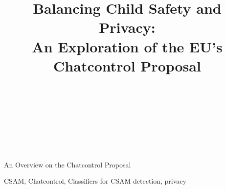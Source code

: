 \documentclass[10pt]{article}
\begin{document}
\title{Balancing Child Safety and Privacy:\\ {\large An Exploration of the EU's Chatcontrol Proposal}%
%
}

\author{\\[2pt] 
\\
\\
\\
\\
}

%
%
{An Overview on the Chatcontrol Proposal} 

\maketitle

\begin{abstract}
    
\end{abstract}

\begin{keywords}
    CSAM, Chatcontrol, Classifiers for CSAM detection, privacy
\end{keywords}








\printbibliography
\end{document}

